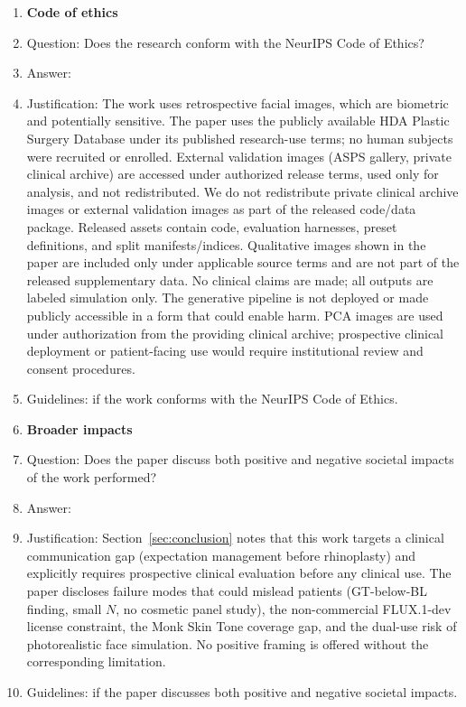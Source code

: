 \begin{enumerate}
\item {\bf Code of ethics}
    \item[] Question: Does the research conform with the NeurIPS Code of Ethics?
    \item[] Answer: \answerYes{}
    \item[] Justification: The work uses retrospective facial images, which are biometric and potentially sensitive. The paper uses the publicly available HDA Plastic Surgery Database under its published research-use terms; no human subjects were recruited or enrolled. External validation images (ASPS gallery, private clinical archive) are accessed under authorized release terms, used only for analysis, and not redistributed. We do not redistribute private clinical archive images or external validation images as part of the released code/data package. Released assets contain code, evaluation harnesses, preset definitions, and split manifests/indices. Qualitative images shown in the paper are included only under applicable source terms and are not part of the released supplementary data. No clinical claims are made; all outputs are labeled simulation only. The generative pipeline is not deployed or made publicly accessible in a form that could enable harm. PCA images are used under authorization from the providing clinical archive; prospective clinical deployment or patient-facing use would require institutional review and consent procedures.
    \item[] Guidelines: \answerYes{} if the work conforms with the NeurIPS Code of Ethics.

\item {\bf Broader impacts}
    \item[] Question: Does the paper discuss both positive and negative societal impacts of the work performed?
    \item[] Answer: \answerYes{}
    \item[] Justification: Section~\ref{sec:conclusion} notes that this work targets a clinical communication gap (expectation management before rhinoplasty) and explicitly requires prospective clinical evaluation before any clinical use. The paper discloses failure modes that could mislead patients (GT-below-BL finding, small $N$, no cosmetic panel study), the non-commercial FLUX.1-dev license constraint, the Monk Skin Tone coverage gap, and the dual-use risk of photorealistic face simulation. No positive framing is offered without the corresponding limitation.
    \item[] Guidelines: \answerYes{} if the paper discusses both positive and negative societal impacts.


\end{enumerate}
